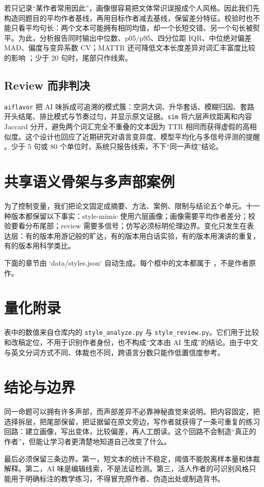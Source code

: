 \documentclass[UTF8,a4paper,11pt]{ctexart}
\begin{document}
若只记录“某作者常用因此”，画像很容易把文体常识误报成个人风格。因此我们先构造同题目的平均作者基线，再用目标作者减去基线，保留差分特征。校验时也不能只看平均句长：两个文本可能拥有相同均值，却一个长短交错、另一个句长被熨平。为此，分析报告同时输出中位数、p05/p95、四分位距 IQR、中位绝对偏差 MAD、偏度与变异系数 CV；MATTR 还可降低文本长度差异对词汇丰富度比较的影响 \citep{covington2010mattr}；少于 20 句时，尾部只作线索。

\subsection{Review 而非判决}

\texttt{aiflavor} 把 AI 味拆成可追溯的模式簇：空洞大词、升华套话、模糊归因、套路开头结尾、排比模式与节奏过匀，并显示原文证据。\texttt{sim} 将六层声纹距离和内容 Jaccard 分开，避免两个词汇完全不重叠的文本因为 TTR 相同而获得虚假的高相似度。这个设计也回应了近期研究对语言变异度、模型平均化与多信号评测的提醒 \citep{zanotto2025linguistic,reinhart2025llm,zanotto2024variability}。少于 5 句或 80 个单位时，系统只报告线索，不下“同一声纹”结论。

\section{共享语义骨架与多声部案例}

为了控制变量，我们把论文固定成摘要、方法、案例、限制与结论五个单元。十一种版本都保留以下事实：style-mimic 使用六层画像；画像需要平均作者差分；校验要看分布尾部；review 需要多信号；仿写必须标明伦理边界。变化只发生在表达层：有的版本用游记般的旷达，有的版本用白话实验，有的版本用演讲的重复，有的版本用科学类比。

下面的章节由 `data/styles.json` 自动生成。每个框中的文本都属于 \pastiche，不是作者原作。



\section{量化附录}



表中的数值来自仓库内的 \texttt{style\_analyze.py} 与 \texttt{style\_review.py}。它们用于比较和改稿定位，不用于识别作者身份，也不构成“文本由 AI 生成”的结论。由于中文与英文分词方式不同、体裁也不同，跨语言分数只能作低置信度参考。

\section{结论与边界}

同一命题可以拥有许多声部，而声部差异不必靠神秘直觉来说明。把内容固定，把选择拆层，把尾部保留，把证据留在原文旁边，写作者就获得了一条可重复的练习回路：建立画像，写出变体，比较偏差，再人工朗读。这个回路不会制造“真正的作者”，但能让学习者更清楚地知道自己改变了什么。

最后必须保留三条边界。第一，短文本的统计不稳定，阈值不能脱离样本量和体裁解释。第二，AI 味是编辑线索，不是法证检测。第三，活人作者的可识别风格只能用于明确标注的教学练习，不得冒充原作者、伪造出处或制造背书。



\end{document}
